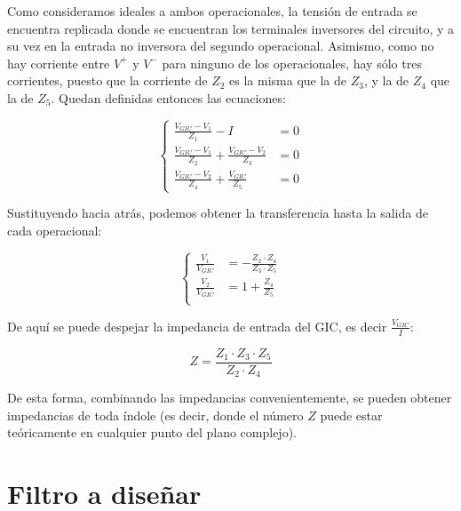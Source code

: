 \documentclass[../../tc_tp3_main.tex]{subfiles}
\begin{document}
Como consideramos ideales a ambos operacionales, la tensi\'on de entrada se encuentra replicada donde se encuentran los terminales inversores del circuito, y a su vez en la entrada no inversora del segundo operacional. Asimismo, como no hay corriente entre $V^+$ y $V^-$ para ninguno de los operacionales, hay s\'olo tres corrientes, puesto que la corriente de $Z_2$ es la misma que la de $Z_3$, y la de $Z_4$ que la de $Z_5$. Quedan definidas entonces las ecuaciones: \par


 \[
	\left\{
 	\begin{aligned}
		 \frac{V_{GIC} - V_1}{Z_1} - I &= 0\\
		\frac{V_{GIC} - V_1}{Z_2} + \frac{V_{GIC} - V_2}{Z_3} &= 0 \\ 
		\frac{V_{GIC} - V_2}{Z_4} + \frac{V_{GIC}}{Z_5} &= 0
	\end{aligned}
	\right.
 \]
 
 Sustituyendo hacia atr\'as, podemos obtener la transferencia hasta la salida de cada operacional:
 
\begin{equation}
	\label{eq:1-v1v2g}
	\left\{
 	\begin{aligned}
		\frac{V_1}{V_{GIC}} & =  -\frac{Z_2 \cdot Z_4}{Z_3 \cdot Z_5}\\
		\frac{V_2}{V_{GIC}} & =  1+ \frac{Z_4}{Z_5} \\ 
	\end{aligned}
	\right.
 \end{equation}
 
 
 
 De aqu\'i se puede despejar la impedancia de entrada del GIC, es decir $\frac{V_{GIC}}{I}$:
 
 \begin{equation}
 	\label{eq:1-z-gic-g}
 	Z = \frac{Z_1 \cdot Z_3 \cdot Z_5}{Z_2 \cdot Z_4}
 \end{equation}

De esta forma, combinando las impedancias convenientemente, se pueden obtener impedancias de toda \'indole (es decir, donde el n\'umero $Z$ puede estar te\'oricamente en cualquier punto del plano complejo). \par





\section{Filtro a dise\~nar}
\end{document}
